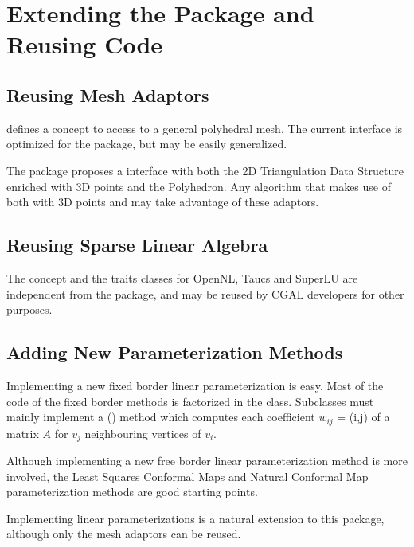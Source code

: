 \section{Extending the Package and Reusing Code}

\subsection{Reusing Mesh Adaptors}

 defines a concept to access to a
general polyhedral mesh.  The current interface is optimized for the
 package, but may be easily generalized.

The package proposes a  interface with
both the 2D Triangulation Data Structure enriched with 3D points and
the Polyhedron. Any algorithm that makes use of both
 with 3D points and
 may take advantage of these adaptors.


\subsection{Reusing Sparse Linear Algebra}

The  concept and the traits classes
for OpenNL, {\sc Taucs} and SuperLU are independent from the
 package, and may be reused by CGAL developers for
other purposes.


\subsection{Adding New Parameterization Methods}

Implementing a new fixed border linear parameterization is easy.  Most
of the code of the fixed border methods is factorized in the
class.  Subclasses must mainly
implement a () method which computes each
coefficient $w_{ij}$ = (i,j) of a matrix $A$ for $v_j$ neighbouring
vertices of $v_i$.

Although implementing a new free border linear parameterization
method is more involved, the Least Squares Conformal Maps and Natural
Conformal Map parameterization methods are good starting points.

Implementing  linear parameterizations is a natural extension
to this package, although only the mesh adaptors can be reused.


